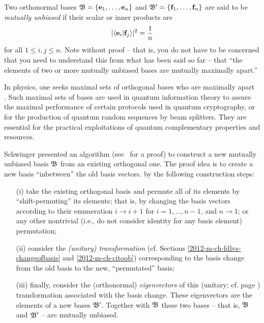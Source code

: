 Two  orthonormal bases
${\frak B} =\{
{\bf e}_1,
\ldots ,
{\bf e}_n
\}$
and
${\frak B}'=\{
{\bf f}_1,
\ldots ,
{\bf f}_n
\}$
are said to be {\em mutually unbiased}
if
their scalar or inner products are
\begin{equation}
\vert \langle {\bf e}_i\vert {\bf f}_j  \rangle \vert^2
=
\frac{1}{n}
\end{equation}
for all $1\le i,j\le n$.
Note without proof -- that is, you do not have to be concerned
that you need to understand  this from what has been said so far --
that ``the elements of two or more mutually unbiased bases are mutually maximally apart.''

{\color{Purple}
In physics, one seeks maximal sets of orthogonal bases who
are maximally apart~\cite{WooFie,durt} .
Such maximal sets of bases are used in quantum information theory
to assure the maximal performance of certain protocols
used in quantum cryptography, or for the production of
quantum random sequences by beam splitters.
They are essential for the practical exploitations of quantum complementary properties
and resources.
}



Schwinger presented an algorithm (see~\cite{Schwinger.60} for a proof)
to construct a new mutually unbiased basis ${\frak B}$   from an existing orthogonal one.
The proof idea
is to create a new basis ``inbetween'' the old basis vectors.
by the following construction steps:
\begin{itemize}
\item[(i)]
take the existing orthogonal basis and permute all of its elements by ``shift-permuting'' its elements; that is, by
changing
the basis vectors according to their enumeration $i \rightarrow i+1$ for $i=1,\ldots , n-1$, and $n \rightarrow 1$;
or any other nontrivial (i.e., do not consider identity for any basis element) permutation;
\item[(ii)]
consider the {\em (unitary) transformation} (cf. Sections \ref{2012-m-ch-fdlvs-changeofbasis} and \ref{2012-m-ch-citoob})
corresponding to the basis change from the old basis to the new, ``permutated'' basis;
\item[(iii)]
finally, consider the (orthonormal) {\em eigenvectors} 
of this (unitary; cf. page
\pageref{2014-m-ch-fdvs-unitary}) transformation associated with the basis change.
These eigenvectors are the elements of a new bases  ${\frak B}'$.
Together with ${\frak B}$ these two bases
-- that is, ${\frak B}$ and ${\frak B}'$ --  are mutually unbiased.
\end{itemize}

